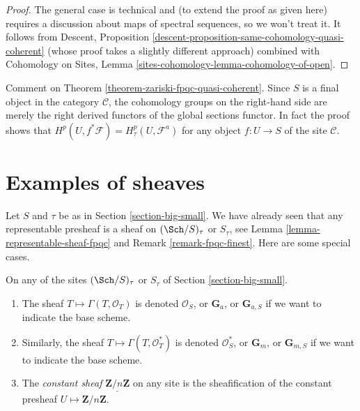\begin{proof}
\medskip\noindent
The general case is technical and (to extend the proof as given here)
requires a discussion about maps of spectral sequences, so we won't treat it.
It follows from
Descent, Proposition \ref{descent-proposition-same-cohomology-quasi-coherent}
(whose proof takes a slightly different approach) combined with
Cohomology on Sites, Lemma \ref{sites-cohomology-lemma-cohomology-of-open}.
\end{proof}

\begin{remark}
\label{remark-right-derived-global-sections}
Comment on Theorem \ref{theorem-zariski-fpqc-quasi-coherent}.
Since $S$ is a final object in the category $\mathcal{C}$, the cohomology
groups on the right-hand side are merely the right derived functors of the
global sections functor. In fact the proof shows that
$H^p(U, f^*\mathcal{F}) = H^p_\tau(U, \mathcal{F}^a)$
for any object $f : U \to S$ of the site $\mathcal{C}$.
\end{remark}





\section{Examples of sheaves}
\label{section-examples-sheaves}

\noindent
Let $S$ and $\tau$ be as in Section \ref{section-big-small}.
We have already seen that any representable presheaf is a sheaf on
$(\Sch/S)_\tau$ or $S_\tau$, see
Lemma \ref{lemma-representable-sheaf-fpqc}
and
Remark \ref{remark-fpqc-finest}.
Here are some special cases.

\begin{definition}
\label{definition-additive-sheaf}
On any of the sites $(\Sch/S)_\tau$ or $S_\tau$ of
Section \ref{section-big-small}.
\begin{enumerate}
\item The sheaf $T \mapsto \Gamma(T, \mathcal{O}_T)$ is denoted
$\mathcal{O}_S$, or $\mathbf{G}_a$, or $\mathbf{G}_{a, S}$ if we
want to indicate the base scheme.
\item Similarly, the sheaf
$T \mapsto \Gamma(T, \mathcal{O}^*_T)$ is denoted $\mathcal{O}_S^*$, or
$\mathbf{G}_m$, or $\mathbf{G}_{m, S}$ if we want
to indicate the base scheme.
\item The {\it constant sheaf} $\underline{\mathbf{Z}/n\mathbf{Z}}$ on any
site is the sheafification of the constant presheaf
$U \mapsto \mathbf{Z}/n\mathbf{Z}$.
\end{enumerate}
\end{definition}

